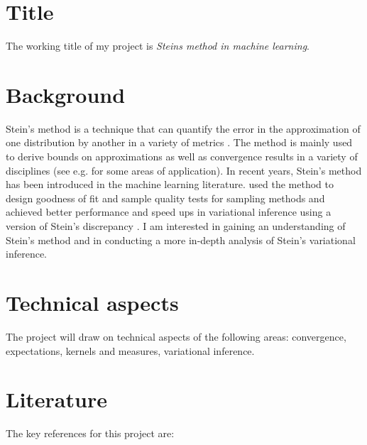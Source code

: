 \documentclass[]{STAT_547C}
\begin{document}
\vspace{-2cm}
\section{Title}

The working title of my project is \emph{Stein\textquotesingle s method in machine learning}.  

\section{Background}

Stein's method \citep{stein1972bound} is a technique that can quantify the error in the approximation of one distribution by another in a variety of metrics \citep{ross2011fundamentals}. The method is mainly used to derive bounds on approximations as well as convergence results in a variety of disciplines (see e.g.\cite{reinert2011short} for some areas of application). In recent years, Stein's method has been introduced in the machine learning literature. \cite{gorham2015measuring,liu2016kernelized,chwialkowski2016kernel,oates2017control} used the method to design goodness of fit and sample quality tests for sampling methods and \cite{liu2016stein,zhuo2017message} achieved better performance and speed ups in variational inference using a version of Stein's discrepancy \cite{liu2016kernelized}. I am interested in gaining an understanding of Stein's method and in conducting a more in-depth analysis of Stein's variational inference.

\section{Technical aspects}

The project will draw on technical aspects of the following areas: convergence, expectations, kernels and measures, variational inference.


\section{Literature}

The key references for this project are:
\end{document}
